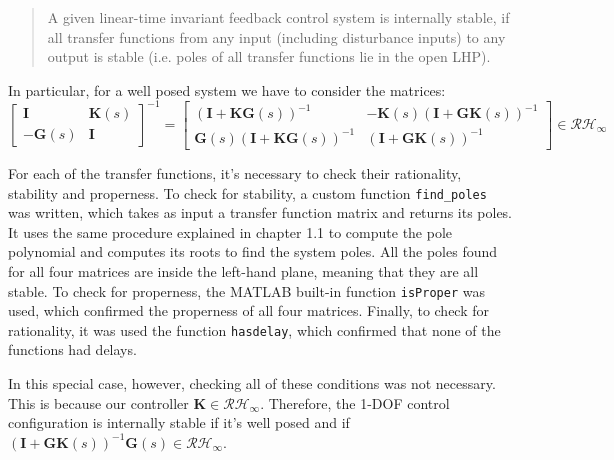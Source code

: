 \documentclass{scrreprt}
\begin{document}
\begin{quote}
    A given linear-time invariant feedback control system is internally stable, if all transfer functions from any input (including disturbance inputs) to any output is stable (i.e. poles of all transfer functions lie in the open LHP).
\end{quote}

In particular, for a well posed system we have to consider the matrices:
\begin{equation}
    \begin{bmatrix} 
    \boldsymbol{I} & \boldsymbol{K}(s) \\ 
    -\boldsymbol{G}(s) & \boldsymbol{I} 
    \end{bmatrix}^{-1} 
    = 
    \begin{bmatrix} 
    (\boldsymbol{I} + \boldsymbol{K}\boldsymbol{G}(s))^{-1} & -\boldsymbol{K}(s)(\boldsymbol{I} + \boldsymbol{G}\boldsymbol{K}(s))^{-1} \\ 
    \boldsymbol{G}(s)(\boldsymbol{I} + \boldsymbol{K}\boldsymbol{G}(s))^{-1} & (\boldsymbol{I} + \boldsymbol{G}\boldsymbol{K}(s))^{-1} 
    \end{bmatrix} \in \mathcal{RH}_{\infty}
    \label{eq:int_stab_check}
\end{equation}

For each of the transfer functions, it's necessary to check their rationality, stability and properness.
To check for stability, a custom function \texttt{find\_poles} was written, which takes as input a transfer function matrix and returns its poles. It uses the same procedure explained in chapter 1.1 to compute the pole polynomial and computes its roots to find the system poles.
All the poles found for all four matrices are inside the left-hand plane, meaning that they are all stable. To check for properness, the MATLAB built-in function \texttt{isProper} was used, which confirmed the properness of all four matrices. Finally, to check for rationality, it was used the function \texttt{hasdelay}, which confirmed that none of the functions had delays.

In this special case, however, checking all of these conditions was not necessary. This is because our controller $\boldsymbol{K}\in\mathcal{RH}_\infty$. Therefore, the 1-DOF control configuration is internally stable if it's well posed and if $(\boldsymbol{I} + \boldsymbol{G}\boldsymbol{K}(s))^{-1}\boldsymbol{G}(s)\in \mathcal{RH}_{\infty}$.
\end{document}
